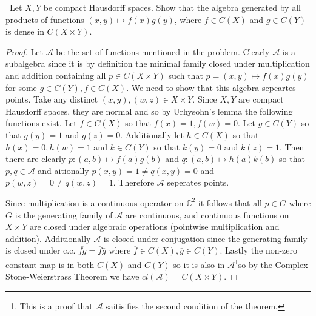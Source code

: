 \documentclass[11pt]{amsart}
\theoremstyle{definition}
\numberwithin{theorem}{section}
\numberwithin{definition}{section}
\numberwithin{equation}{section}
\def\scripta{{\mathcal A}}
\begin{document}
\medskip {}\ Let $X,Y$ be compact Hausdorff spaces. Show that the algebra generated by all products of functions $(x,y) \mapsto f(x)g(y)$, where $f \in C(X)$ and $g \in C(Y)$ is dense in $C(X \times Y).$
\begin{proof}
	Let $\scripta$ be the set of functions mentioned in the problem. Clearly $\scripta$ is a subalgebra since it is by definition the minimal family closed under multiplication and addition containing all $p \in C(X \times Y)$ such that $p = (x,y) \mapsto f(x)g(y)$ for some $g \in C(Y), f \in C(X)$. We need to show that this algebra sepeartes points. Take any distinct $(x,y), (w,z) \in X \times Y$. Since $X, Y$ are compact Hausdorff spaces, they are normal and so by Urhysohn's lemma the following functions exist. Let $f \in C(X)$ so that $f(x) = 1, f(w) = 0.$ Let $g \in C(Y)$ so that $g(y) = 1$ and $g(z) = 0.$ Additionally let $h \in C(X)$ so that $h(x) = 0, h(w) = 1$ and $k \in C(Y)$ so that $k(y) = 0$ and $k(z) = 1.$ Then there are clearly $p: (a,b) \mapsto f(a)g(b)$ and $q: (a,b) \mapsto h(a)k(b)$ so that $p,q \in \scripta$ and aitionally $p(x,y) = 1 \neq q(x,y) = 0$ and $p(w,z) = 0 \neq q(w,z) = 1.$ Therefore $\scripta$ seperates points.

	Since multiplication is a continuous operator on $\mathbb{C}^2$ it follows that all $p \in G$ where $G$ is the generating family of $\scripta$ are continuous, and continuous functions on $X \times Y$ are closed under algebraic operations (pointwise multiplication and addition). Additionally $\scripta$ is closed under conjugation since the generating family is closed under c.c. $\overline{fg} = \overline{f}\overline{g}$ where $\overline{f} \in C(X), \overline{g} \in C(Y)$. Lastly the non-zero constant map is in both $C(X)$ and $C(Y)$ so it is also in $\scripta$\footnote{This is a proof that $\scripta$ saitisifies the second condition of the theorem. }so by the  Complex Stone-Weierstrass Theorem we have $cl(\scripta) = C(X \times Y).$
\end{proof}
\end{document}
